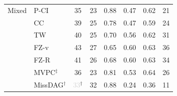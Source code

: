 \begin{tabular}{llcccccc}
    \midrule
    Mixed     & P-CI               & 35 & 23 & 0.88 & 0.47 & 0.62 & 21 \\
              & CC                 & 39 & 25 & 0.78 & 0.47 & 0.59 & 24 \\
              & TW                 & 40 & 25 & 0.70 & 0.56 & 0.62 & 31 \\
              & FZ-v               & 43 & 27 & 0.65 & 0.60 & 0.63 & 36 \\
              & FZ-R               & 41 & 26 & 0.68 & 0.60 & 0.63 & 34 \\
              & MVPC$^\ddagger$    & 36 & 23 & 0.81 & 0.53 & 0.64 & 26 \\
              & MissDAG$^\dagger$  & \textcolor{lightgray}{33}$^\dagger$ & 32 & 0.88 & 0.24 & 0.36 & 11 \\
    \bottomrule
\end{tabular}
